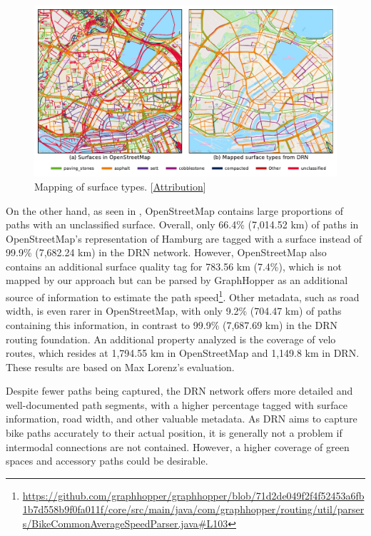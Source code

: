 \begin{figure}[t]
\centering
\includegraphics[width=\linewidth]{images/routing-drn-osm-map-surfaces.pdf} 
\caption{Mapping of surface types. [\hyperref[attribution]{Attribution}]}
\label{fig:routing-drn-osm-map-surfaces}
\end{figure}

On the other hand, as seen in , OpenStreetMap contains large proportions of paths with an unclassified surface. Overall, only 66.4\% (7,014.52 km) of paths in OpenStreetMap's representation of Hamburg are tagged with a surface instead of 99.9\% (7,682.24 km) in the DRN network. However, OpenStreetMap also contains an additional surface quality tag for 783.56 km (7.4\%), which is not mapped by our approach but can be parsed by GraphHopper as an additional source of information to estimate the path speed\footnote{\url{https://github.com/graphhopper/graphhopper/blob/71d2de049f2f4f52453a6fb1b7d558b9f0fa011f/core/src/main/java/com/graphhopper/routing/util/parsers/BikeCommonAverageSpeedParser.java\#L103}}. Other metadata, such as road width, is even rarer in OpenStreetMap, with only 9.2\% (704.47 km) of paths containing this information, in contrast to 99.9\% (7,687.69 km) in the DRN routing foundation. An additional property analyzed is the coverage of velo routes, which resides at 1,794.55 km in OpenStreetMap and 1,149.8 km in DRN. These results are based on Max Lorenz's \cite{lorenz_2022} evaluation.

Despite fewer paths being captured, the DRN network offers more detailed and well-documented path segments, with a higher percentage tagged with surface information, road width, and other valuable metadata. As DRN aims to capture bike paths accurately to their actual position, it is generally not a problem if intermodal connections are not contained. However, a higher coverage of green spaces and accessory paths could be desirable. 

